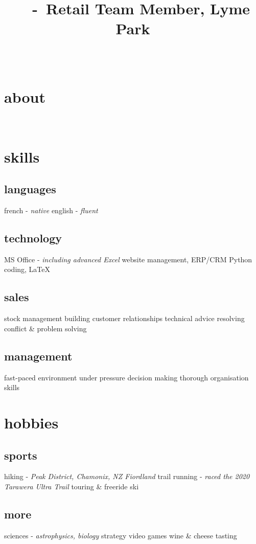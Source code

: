 \documentclass[a4paper]{farangoth-cv}
\newcommand*{\cvTitle}{Retail Team Member, Lyme Park}
\begin{document}
\title{\myFirstName\ \myLastName\ \--\ \cvTitle}
\author{\myFirstName\ \myLastName}

\makeheader{}

\begin{aside}
  \section{about}
  \href{mailto:\myMail}{\myMail}
  \href{tel:\myPhoneNumberUK}{\myPhoneNumberUK}
  ~
  \myAddress{}

  \section{skills}
  \subsection{languages}
  french \-- \emph{native}
  english \-- \emph{fluent}

  \subsection{technology}
  MS Office \--  \emph{including advanced Excel}
  website management, ERP/CRM
  Python coding, \LaTeX%

  \subsection{sales}
  stock management
  building customer relationships
  technical advice
  resolving conflict \& problem solving

  \subsection{management}
  fast-paced environment
  under pressure decision making
  thorough organisation skills

  \section{hobbies}
  \subsection{sports}
  hiking \-- \emph{Peak District, Chamonix, NZ Fiordland}
  trail running \-- \emph{raced the 2020 Tarawera Ultra Trail}
  touring \& freeride ski
  \subsection{more}
  sciences \-- \emph{astrophysics, biology}
  strategy video games
  wine \& cheese tasting
\end{aside}
\end{document}
